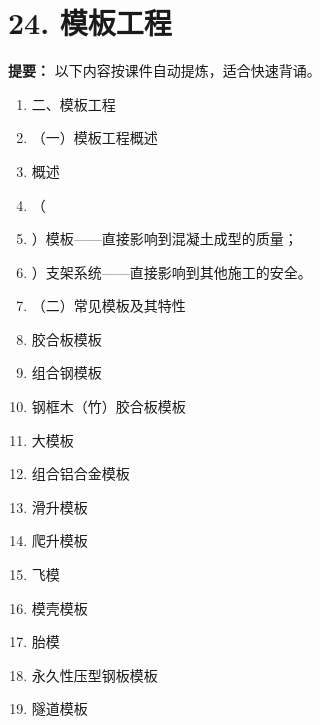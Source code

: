 \documentclass[UTF8,fontset=fandol,11pt]{ctexart}
\begin{document}
\newpage

\section*{24. 模板工程}


\begin{mainbox}

\textbf{提要：} 以下内容按课件自动提炼，适合快速背诵。

\end{mainbox}

\begin{enumerate}[label=\arabic*.]

\item 二、模板工程

\item （一）模板工程概述

\item 概述

\item （

\item ）模板——直接影响到混凝土成型的质量；

\item ）支架系统——直接影响到其他施工的安全。

\item （二）常见模板及其特性

\item 胶合板模板

\item 组合钢模板

\item 钢框木（竹）胶合板模板

\item 大模板

\item 组合铝合金模板

\item 滑升模板

\item 爬升模板

\item 飞模

\item 模壳模板

\item 胎模

\item 永久性压型钢板模板

\item 隧道模板


\end{enumerate}
\end{document}

